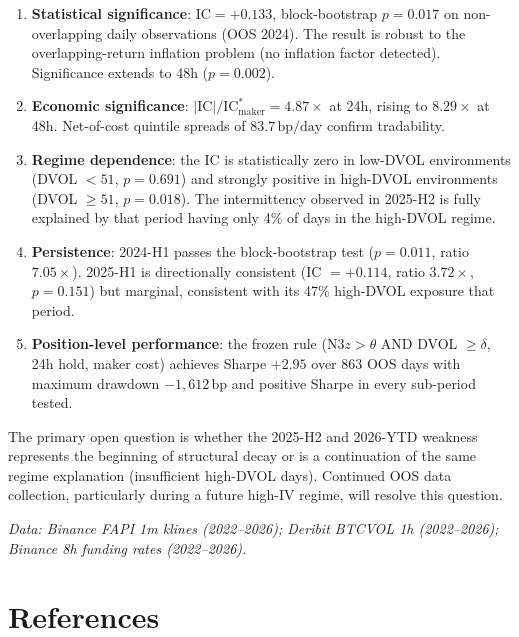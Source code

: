 \documentclass[12pt, a4paper]{article}
\theoremstyle{plain}
\theoremstyle{definition}
\newcommand{\IC}{\mathrm{IC}}
\newcommand{\bp}{\,\mathrm{bp}}
\begin{document}
\begin{enumerate}
  \item \textbf{Statistical significance}: $\IC = +0.133$, block-bootstrap
        $p = 0.017$ on non-overlapping daily observations (OOS 2024). The
        result is robust to the overlapping-return inflation problem
        (no inflation factor detected). Significance extends to 48h
        ($p = 0.002$).

  \item \textbf{Economic significance}: $|\IC|/\IC^*_{\mathrm{maker}} = 4.87\times$
        at 24h, rising to $8.29\times$ at 48h. Net-of-cost quintile spreads
        of $83.7\bp/\text{day}$ confirm tradability.

  \item \textbf{Regime dependence}: the IC is statistically zero in low-DVOL
        environments (DVOL $< 51$, $p = 0.691$) and strongly positive in
        high-DVOL environments (DVOL $\geq 51$, $p = 0.018$). The
        intermittency observed in 2025-H2 is fully explained by that
        period having only 4\% of days in the high-DVOL regime.

  \item \textbf{Persistence}: 2024-H1 passes the block-bootstrap test
        ($p = 0.011$, ratio $7.05\times$). 2025-H1 is directionally consistent
        (IC $= +0.114$, ratio $3.72\times$, $p = 0.151$) but marginal, consistent
        with its 47\% high-DVOL exposure that period.

  \item \textbf{Position-level performance}: the frozen rule
        (N3$z > \theta$ AND DVOL $\geq \delta$, 24h hold, maker cost) achieves
        Sharpe $+2.95$ over 863 OOS days with maximum drawdown $-1{,}612\bp$
        and positive Sharpe in every sub-period tested.
\end{enumerate}

The primary open question is whether the 2025-H2 and 2026-YTD weakness
represents the beginning of structural decay or is a continuation of the
same regime explanation (insufficient high-DVOL days). Continued OOS data
collection, particularly during a future high-IV regime, will resolve this
question.

\vspace{1em}
\noindent\textit{Data: Binance FAPI 1m klines (2022--2026); Deribit BTCVOL 1h
(2022--2026); Binance 8h funding rates (2022--2026).}

\section*{References}
\begingroup
\setlength{\parindent}{-2em}
\setlength{\leftskip}{2em}
\setlength{\parskip}{6pt}
\small
\end{document}

